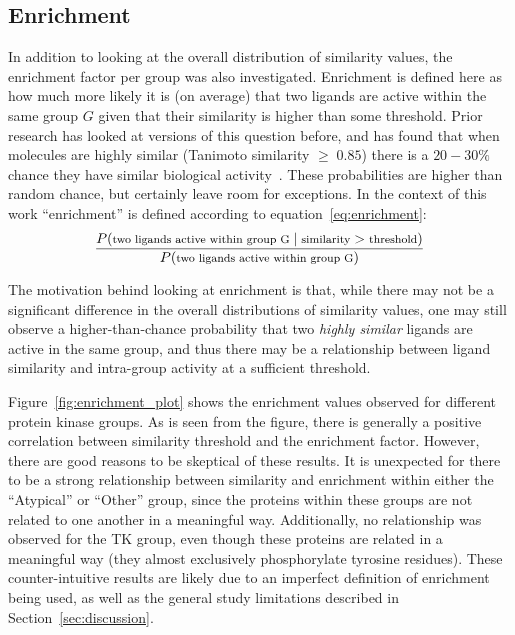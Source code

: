 \documentclass[11pt]{article}
\begin{document}
\subsection{Enrichment}\label{subsec:results_enrichment}
In addition to looking at the overall distribution of similarity values, the enrichment factor per group was also investigated.
Enrichment is defined here as how much more likely it is (on average) that two ligands are active within the same group $G$ given that their similarity is higher than some threshold.  
Prior research has looked at versions of this question before, and has found that when molecules are highly similar (Tanimoto similarity $\geq \; 0.85$) there is a $20-30\%$ chance they have similar biological activity~\cite{martin_kofron_traphagen_2002, chen_greenside_paik_sirota_hadley_butte_2015}. 
These probabilities are higher than random chance, but certainly leave room for exceptions. 
In the context of this work ``enrichment'' is defined according to equation~\ref{eq:enrichment}:
\begin{equation}\label{eq:enrichment}
    \footnotesize
    \frac{P(\text{two ligands active within group G} \; | \; \text{similarity} > \text{threshold})}{P(\text{two ligands active within group G})}
\end{equation}
\noindent

The motivation behind looking at enrichment is that, while there may not be a significant difference in the overall distributions of similarity values, one may still observe a higher-than-chance probability that two \textit{highly similar} ligands are active in the same group, and thus there may be a relationship between ligand similarity and intra-group activity at a sufficient threshold.  


Figure~\ref{fig:enrichment_plot} shows the enrichment values observed for different protein kinase groups. As is seen from the figure, there is generally a positive correlation between similarity threshold and the enrichment factor. 
However, there are good reasons to be skeptical of these results. 
It is unexpected for there to be a strong relationship between similarity and enrichment within either the ``Atypical'' or ``Other'' group, since the proteins within these groups are not related to one another in a meaningful way. 
Additionally, no relationship was observed for the TK group, even though these proteins are related in a meaningful way (they almost exclusively phosphorylate tyrosine residues). 
These counter-intuitive results are likely due to an imperfect definition of enrichment being used, as well as the general study limitations described in Section~\ref{sec:discussion}.
\end{document}
